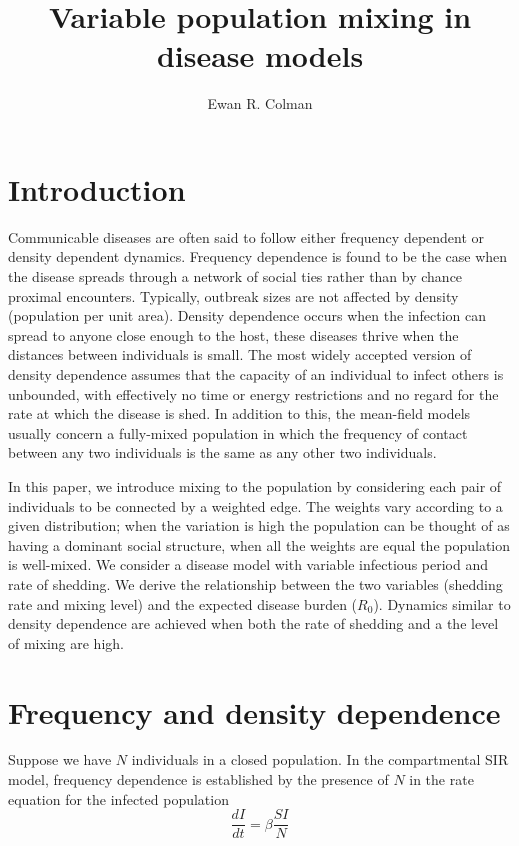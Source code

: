\documentclass[10pt]{article}
\title{Variable population mixing in disease models}
\author[1]{Ewan R. Colman}
\begin{document}
\maketitle
\begin{multicols}{2}
\section{Introduction}
\noindent
Communicable diseases are often said to follow either frequency dependent or density dependent dynamics. Frequency dependence is found to be the case when the disease spreads through a network of social ties rather than by chance proximal encounters. Typically, outbreak sizes are not affected by density (population per unit area). Density dependence occurs when the infection can spread to anyone close enough to the host, these diseases thrive when the distances between individuals is small. The most widely accepted version of density dependence assumes that the capacity of an individual to infect others is unbounded, with effectively no time or energy restrictions and no regard for the rate at which the disease is shed. In addition to this, the mean-field models usually concern a fully-mixed population in which the frequency of contact between any two individuals is the same as any other two individuals.
\newline

In this paper, we introduce mixing to the population by considering each pair of individuals to be connected by a weighted edge. The weights vary according to a given distribution; when the variation is high the population can be thought of as having a dominant social structure, when all the weights are equal the population is well-mixed. We consider a disease model with variable infectious period and rate of shedding. We derive the relationship between the two variables (shedding rate and mixing level) and the expected disease burden ($R_{0}$). Dynamics similar to density dependence are achieved when both the rate of shedding and a the level of mixing are high.


\section{Frequency and density dependence}
Suppose we have $N$ individuals in a closed population. In the compartmental SIR model, frequency dependence is established by the presence of $N$ in the rate equation for the infected population
\begin{equation}
\frac{dI}{dt}=\beta\frac{SI}{N}
\end{equation}


\end{multicols}
\end{document}
